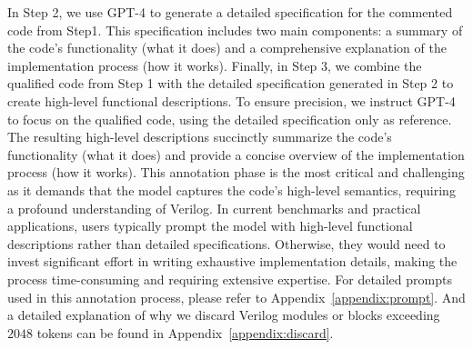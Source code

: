 In Step 2, we use GPT-4 to generate a detailed specification for the commented code from Step1. 
This specification includes two main components: a summary of the code's functionality (what it does) and a comprehensive explanation of the implementation process (how it works). 
Finally, in Step 3, we combine the qualified code from Step 1 with the detailed specification generated in Step 2 to create high-level functional descriptions. 
To ensure precision, we instruct GPT-4 to focus on the qualified code, using the detailed specification only as reference. 
The resulting high-level descriptions succinctly summarize the code's functionality (what it does) and provide a concise overview of the implementation process (how it works).
This annotation phase is the most critical and challenging as it demands that the model captures the code's high-level semantics, requiring a profound understanding of Verilog. In current benchmarks and practical applications, users typically prompt the model with high-level functional descriptions rather than detailed specifications. Otherwise, they would need to invest significant effort in writing exhaustive implementation details, making the process time-consuming and requiring extensive expertise. For detailed prompts used in this annotation process, please refer to Appendix~\ref{appendix:prompt}.
And a detailed explanation of why we discard Verilog modules or blocks exceeding $2048$ tokens can be found in Appendix~\ref{appendix:discard}.


